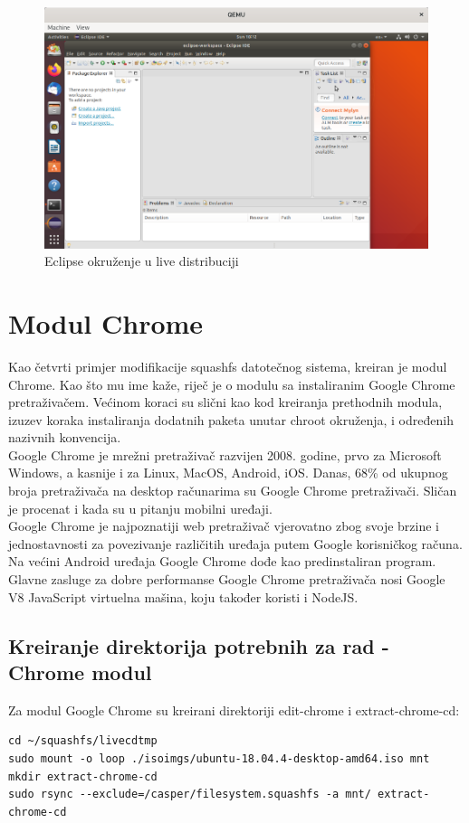 \documentclass[12pt,vi]{mitthesis}
\begin{document}
\begin{figure}[!htb]
\centering
\includegraphics[width=\linewidth]{images/eclipseLive1.png}
\caption{Eclipse okruženje u live distribuciji}
\end{figure}
\newpage
\section*{Modul Chrome}
\indent
Kao četvrti primjer modifikacije squashfs datotečnog sistema, kreiran je modul Chrome. Kao što mu ime kaže, riječ je o modulu sa instaliranim Google Chrome pretraživačem. Većinom koraci su slični kao kod kreiranja prethodnih modula, izuzev koraka instaliranja dodatnih paketa unutar chroot okruženja, i određenih nazivnih konvencija.\\
\indent
Google Chrome je mrežni pretraživač razvijen 2008. godine, prvo za Microsoft Windows, a kasnije i za Linux, MacOS, Android, iOS. Danas, 68\% od ukupnog broja pretraživača na desktop računarima su Google Chrome pretraživači. Sličan je procenat i kada su u pitanju mobilni uređaji.\\
\indent
Google Chrome je najpoznatiji web pretraživač vjerovatno zbog svoje brzine i jednostavnosti za povezivanje različitih uređaja putem Google korisničkog računa. Na većini Android uređaja Google Chrome dođe kao predinstaliran program. Glavne zasluge za dobre performanse Google Chrome pretraživača nosi Google V8 JavaScript virtuelna mašina, koju također koristi i NodeJS.
\subsection*{Kreiranje direktorija potrebnih za rad - Chrome modul}
\indent
Za modul Google Chrome su kreirani direktoriji edit-chrome i extract-chrome-cd:
\begin{lstlisting}[style=BashInputStyle]
cd ~/squashfs/livecdtmp
sudo mount -o loop ./isoimgs/ubuntu-18.04.4-desktop-amd64.iso mnt
mkdir extract-chrome-cd
sudo rsync --exclude=/casper/filesystem.squashfs -a mnt/ extract-chrome-cd
\end{lstlisting}
\end{document}
